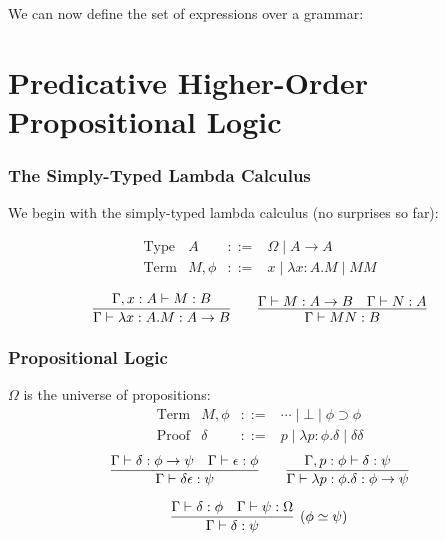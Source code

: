 \documentclass[handout]{beamer}
\begin{document}
\begin{frame}[fragile]
We can now define the set of expressions over a grammar:
\small{
}
\end{frame}

\section{Predicative Higher-Order Propositional Logic}

\begin{frame}
\frametitle{The Simply-Typed Lambda Calculus}
We begin with the simply-typed lambda calculus (no surprises so far):

$$
\begin{array}{lrcl}
\text{Type} & A & ::= & \Omega \mid A \rightarrow A \\
\text{Term} & M,\phi & ::= & x \mid \lambda x:A.M \mid M M
\end{array}
$$

\[ \infer{\Gamma \vdash \lambda x:A.M : A \rightarrow B}{\Gamma, x : A \vdash M : B} \qquad
\infer{\Gamma \vdash M N : B} {\Gamma \vdash M : A \rightarrow B \quad \Gamma \vdash N : A} \]
\end{frame}

\begin{frame}[fragile]
\frametitle{Propositional Logic}
$\Omega$ is the universe of propositions:
\[
\begin{array}{lrcl}
\text{Term} & M,\phi & ::= & \cdots \mid \bot \mid \phi \supset \phi \\
\text{Proof} & \delta & ::= & p \mid \lambda p : \phi . \delta \mid \delta \delta
\end{array}
\]
\[ \infer{\Gamma \vdash \delta \epsilon : \psi} {\Gamma \vdash \delta : \phi \rightarrow \psi \quad \Gamma \vdash \epsilon : \phi}
\qquad \infer{\Gamma \vdash \lambda p : \phi . \delta : \phi \rightarrow \psi}{\Gamma, p : \phi \vdash \delta : \psi} \]

\[ \infer[(\phi \simeq \psi)]{\Gamma \vdash \delta : \psi}{\Gamma \vdash \delta : \phi \quad \Gamma \vdash \psi : \Omega} \]
\end{frame}
\end{document}
